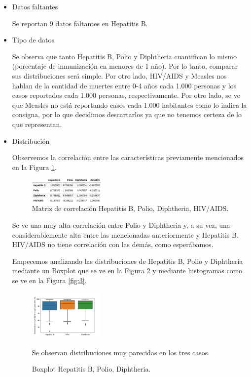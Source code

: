     \begin{itemize}
        \item Datos faltantes
        
            Se reportan $9$ datos faltantes en Hepatitis B.
            
        \item Tipo de datos
        
            Se observa que tanto Hepatitis B, Polio y Diphtheria cuantifican lo mismo (porcentaje de inmunización en menores de 1 año). Por lo tanto, comparar sus distribuciones será simple.
            Por otro lado, HIV/AIDS y Measles nos hablan de la cantidad de muertes entre 0-4 años cada 1.000 personas y los casos reportados cada 1.000 personas, respectivamente. Por otro lado, se ve que Measles no está reportando casos cada 1.000 habitantes como lo indica la consigna, por lo que decidimos descartarlos ya que no tenemos certeza de lo que representan.
        
        \item Distribución 
            
            Observemos la correlación entre las características previamente mencionados en la Figura \ref{fig:1}.
                        
            \begin{figure}[H]
            	\centering
            	\includegraphics[width=0.35\textwidth]{img/1.png}
            	\caption{Matriz de correlación Hepatitis B, Polio, Diphtheria, HIV/AIDS.}
            	
            	\label{fig:1}
            \end{figure}
            
            Se ve una muy alta correlación entre Polio y Diphtheria y, a su vez, una considerablemente alta entre las mencionadas anteriormente y Hepatitis B. HIV/AIDS no tiene correlación con las demás, como esperábamos.
            
            
            Empecemos analizando las distribuciones de Hepatitis B, Polio y Diphtheria mediante un Boxplot que se ve en la Figura \ref{fig:2} y mediante histogramas como se ve en la Figura \ref{fig:3}.
            
             \begin{figure}[H]
            	\centering
            	\includegraphics[width=0.35\textwidth]{img/2.png}
            	\caption{Boxplot Hepatitis B, Polio, Diphtheria.}
            	Se observan distribuciones muy parecidas en los tres casos.
            	\label{fig:2}
            \end{figure}
            

\end{itemize}
